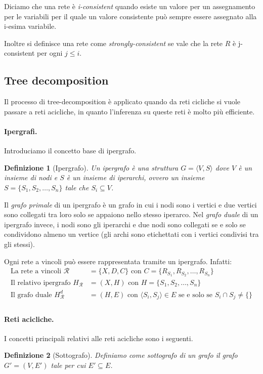 \documentclass[a4paper, 11pt]{article}
\newtheorem{definit}{Definizione}[subsection]
\begin{document}
Diciamo che una rete è \textit{i-consistent} quando esiste un valore per un assegnamento per le variabili per il quale un valore consistente può sempre essere assegnato alla i-esima variabile.

Inoltre si definisce una rete come \textit{strongly-consistent} se vale che la rete $R$ è j-consistent per ogni $j \leq i$.

\subsection{Tree decomposition}
Il processo di tree-decomposition è applicato quando da reti cicliche si vuole passare a reti acicliche, in quanto l'inferenza su queste reti è molto più efficiente. 

\paragraph{Ipergrafi.}Introduciamo il concetto base di ipergrafo.
\begin{definit}[Ipergrafo]
	Un ipergrafo è una struttura $G= \langle V, S \rangle$ dove $V$ è un insieme di nodi e $S$ è un insieme di iperarchi, ovvero un insieme $S = \lbrace S_1, S_2, \dots, S_n \rbrace$ tale che $S_i \subseteq V$.
\end{definit}

Il \textit{grafo primale} di un ipergrafo è un grafo in cui i nodi sono i vertici e due vertici sono collegati tra loro solo se appaiono nello stesso iperarco.  Nel \textit{grafo duale} di un ipergrafo invece, i nodi sono gli iperarchi e due nodi sono collegati se e solo se condividono almeno un vertice (gli archi sono etichettati con i vertici condivisi tra gli stessi).

Ogni rete a vincoli può essere rappresentata tramite un ipergrafo. Infatti:
\begin{align*}
	\text{La rete a vincoli }\mathcal{R} &= \lbrace X, D, C \rbrace \text{ con } C= \lbrace R_{S_1}, R_{S_2}, \dots, R_{S_n} \rbrace \\
	\text{Il relativo ipergrafo } H_\mathcal{R} &= (X,H)  \text{ con } H = \lbrace S_1, S_2, \dots, S_n \rbrace \\
	\text{Il grafo duale } H_\mathcal{R}^d &= (H, E) \text{ con } \langle S_i, S_j \rangle \in E \text{ se e solo se } S_i \cap S_j \neq \lbrace \rbrace\\
\end{align*}

\paragraph{Reti acicliche.} I concetti principali relativi alle reti acicliche sono i seguenti.
\begin{definit}[Sottografo]
	Definiamo come sottografo di un grafo il grafo $G' = (V, E')$ tale per cui $E' \subseteq E$.
\end{definit}
\end{document}
